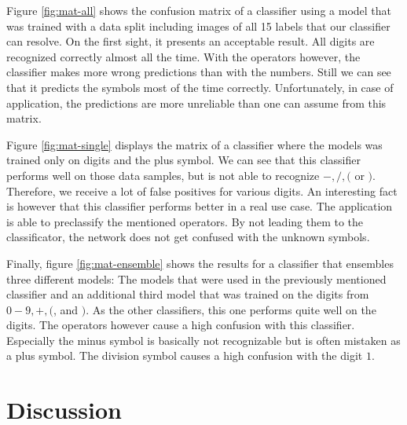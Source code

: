 \documentclass[11pt]{article}
\begin{document}
	Figure \ref{fig:mat-all} shows the confusion matrix of a classifier using a model that was trained with a data split including images of all 15 labels that our classifier can resolve. On the first sight, it presents an acceptable result. All digits are recognized correctly almost all the time. With the operators however, the classifier makes more wrong predictions than with the numbers. Still we can see that it predicts the symbols most of the time correctly. Unfortunately, in case of application, the predictions are more unreliable than one can assume from this matrix. 
	
	Figure \ref{fig:mat-single} displays the matrix of a classifier where the models was trained only on digits and the plus symbol. We can see that this classifier performs well on those data samples, but is not able to recognize $-, /, ($ or $)$. Therefore, we receive a lot of false positives for various digits. An interesting fact is however that this classifier performs better in a real use case. The application is able to preclassify the mentioned operators. By not leading them to the classificator, the network does not get confused with the unknown symbols.
	
	Finally, figure \ref{fig:mat-ensemble} shows the results for a classifier that ensembles three different models: The models that were used in the previously mentioned classifier and an additional third model that was trained on the digits from $0-9, +, ($, and $)$. As the other classifiers, this one performs quite well on the digits. The operators however cause a high confusion with this classifier. Especially the minus symbol is basically not recognizable but is often mistaken as a plus symbol. The division symbol causes a high confusion with the digit $1$.
	

	\section{Discussion}
	
\end{document}
